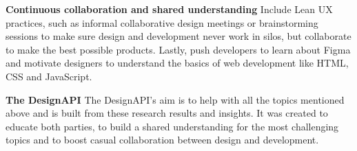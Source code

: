 \textbf{Continuous collaboration and shared understanding}
Include Lean UX practices, such as informal collaborative design meetings or brainstorming sessions
to make sure design and development never work in silos, but collaborate to make the best possible
products. Lastly, push developers to learn about Figma and motivate designers to understand the
basics  of web development like HTML, CSS and JavaScript.

\textbf{The DesignAPI}
The DesignAPI's aim is to help with all the topics mentioned above and is built from these research
results and insights. It was created to educate both parties, to build a shared understanding for the
most challenging topics and to boost casual collaboration between design and development.
